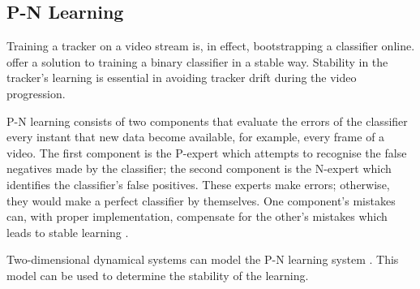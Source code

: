 \subsection{P-N Learning} \label{sec:pnlearning}
  Training a tracker on a video stream is, in effect, bootstrapping a classifier online.
  \citet{PNLearning} offer a solution to training a binary classifier in a stable way.
  Stability in the tracker's learning is essential in avoiding tracker drift during the video progression.

  P-N learning consists of two components that evaluate the errors of the classifier every instant that new data become available, for example, every frame of a video.
  The first component is the P-expert which attempts to recognise the false negatives made by the classifier; the second component is the N-expert which identifies the classifier's false positives.
  These experts make errors; otherwise, they would make a perfect classifier by themselves.
  One component's mistakes can, with proper implementation, compensate for the other's mistakes which leads to stable learning \cite{Kalal2011}.

  Two-dimensional dynamical systems can model the P-N learning system \citep{PNLearning}.
  This model can be used to determine the stability of the learning.
